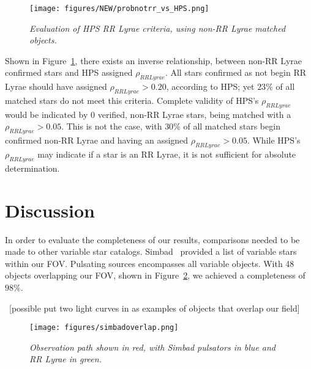 \documentclass[aps,prb,twocolumn,superscriptaddress]{revtex4-1}
\begin{document}
\begin{figure}[H]
 \centering
 	\texttt{[image: figures/NEW/probnotrr\_vs\_HPS.png]}
 \caption{\it \small{Evaluation of HPS RR Lyrae criteria, using non-RR Lyrae matched objects.}}
 \label{fig:probnotrrHPS}
\end{figure}



Shown in Figure~\ref{fig:probnotrrHPS}, there exists an inverse relationship, between non-RR Lyrae confirmed stars and HPS 
assigned $\rho_{RRLyrae}$.   
All stars confirmed as not begin RR Lyrae should have assigned $\rho_{RRLyrae} > 0.20$, according to HPS; yet $23\%$ of 
all matched stars do not meet this criteria.  Complete validity of HPS's $\rho_{RRLyrae}$ would be indicated by 0 verified, 
non-RR Lyrae stars, being matched with a $\rho_{RRLyrae} > 0.05$.  This is not the case, with $30\%$ of all matched stars begin 
confirmed non-RR Lyrae and having an assigned $\rho_{RRLyrae} > 0.05$.  While HPS's $\rho_{RRLyrae}$ may indicate if a star is 
an RR Lyrae, it is not sufficient for absolute determination.







\section{Discussion}


In order to evaluate the completeness of our results, comparisons needed to be made to other variable star catalogs.  Simbad~\cite{simbad} provided a list of variable stars within our FOV.  Pulsating sources encompasses all variable objects.  With 48 objects overlapping our FOV, shown in Figure~\ref{fig:simoverlap}, we achieved a completeness of $98\%$.

~[possible put two light curves in as examples of objects that overlap our field]\\

\begin{figure}[H]
 \centering
 	\texttt{[image: figures/simbadoverlap.png]}
 \caption{\it \small{Observation path shown in red, with Simbad pulsators in blue and RR Lyrae in green.}}
 \label{fig:simoverlap}
\end{figure}
\end{document}
